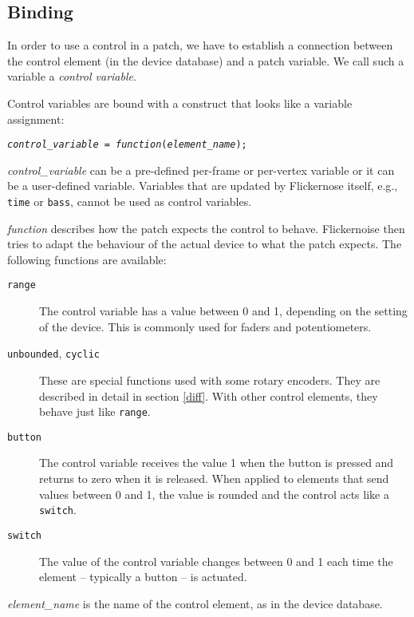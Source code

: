 \documentclass[11pt,a4paper]{article}
\newenvironment{expose}{\vskip3mm\qquad\begin{raggedright}}{%
\end{raggedright}\vskip3mm}
\begin{document}


\subsection{Binding}

In order to use a control in a patch, we have to establish a connection
between the control element (in the device database) and a patch
variable. We call such a variable a {\em control variable}.

Control variables are bound with a construct that looks like a
variable assignment:

\begin{expose}
{\tt {\em control\_variable} = {\em function}({\em element\_name});}
\end{expose}

{\em control\_variable} can be a pre-defined per-frame or per-vertex
variable or it can be a user-defined variable. Variables that are
updated by Flickernose itself, e.g., {\tt time} or {\tt bass}, cannot
be used as control variables.

{\em function} describes how the patch expects the control to behave.
Flickernoise then tries to adapt the behaviour of the actual device
to what the patch expects. The following functions are available:

\begin{description}
  \item[\tt range]
    The control variable has a value between 0 and 1, depending on the
    setting of the device. This is commonly used for faders and
    potentiometers.
  \item[{\tt unbounded}, {\tt cyclic}]
    These are special functions used with some rotary encoders. They
    are described in detail in section \ref{diff}. With other control
    elements, they behave just like {\tt range}.
  \item[\tt button]
    The control variable receives the value 1 when the button is
    pressed and returns to zero when it is released. When applied to
    elements that send values between 0 and 1, the value is rounded
    and the control acts like a {\tt switch}.
  \item[\tt switch]
    The value of the control variable changes between 0 and 1 each
    time the element -- typically a button -- is actuated. 
\end{description}

{\em element\_name} is the name of the control element, as in the
device database.
\end{document}
